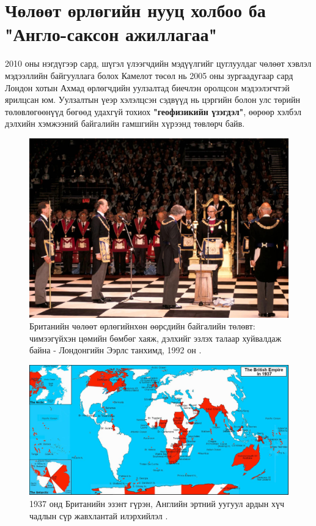 \documentclass[10pt,twocolumn,letterpaper]{article}
\begin{document}
\section{Чөлөөт өрлөгийн нууц холбоо ба "Англо-саксон ажиллагаа"}

2010 оны нэгдүгээр сард, шүгэл үлээгчдийн мэдүүлгийг цуглуулдаг чөлөөт хэвлэл мэдээллийн байгууллага болох Камелот төсөл нь 2005 оны зургаадугаар сард Лондон хотын Ахмад өрлөгчдийн уулзалтад биечлэн оролцсон мэдээлэгчтэй \cite{4,6} ярилцсан юм. Уулзалтын үеэр хэлэлцсэн сэдвүүд нь цэргийн болон улс төрийн төлөвлөгөөнүүд бөгөөд удахгүй тохиох \textbf{"геофизикийн үзэгдэл"}, өөрөөр хэлбэл дэлхийн хэмжээний байгалийн гамшгийн хүрээнд төвлөрч байв.

\begin{figure}[b]
\begin{center}
\includegraphics[width=1\linewidth]{freemason.jpg}
\end{center}
   \caption{Британийн чөлөөт өрлөгийнхөн өөрсдийн байгалийн төлөвт: чимээгүйхэн цөмийн бөмбөг хаяж, дэлхийг эзлэх талаар хуйвалдаж байна - Лондонгийн Ээрлс танхимд, 1992 он \cite{5}.}
\label{fig:1}
\label{fig:onecol}
\end{figure}

\begin{figure}[t]
\begin{center}
\includegraphics[width=1\textwidth]{british.jpg}
\end{center}
   \caption{1937 онд Британийн эзэнт гүрэн, Английн эртний уугуул ардын хүч чадлын сүр жавхлантай илэрхийлэл \cite{14}.}
   \label{fig:2}
\end{figure}
\end{document}
